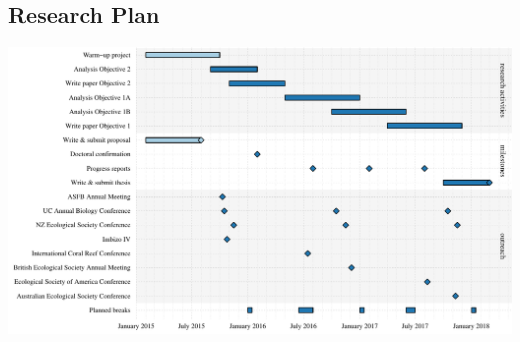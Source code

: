 \documentclass[a4paper]{article}
\begin{document}
\begin{landscape}
\section{Research Plan}
\includegraphics{schedule}
\end{landscape}

\printbibliography
\end{document}
